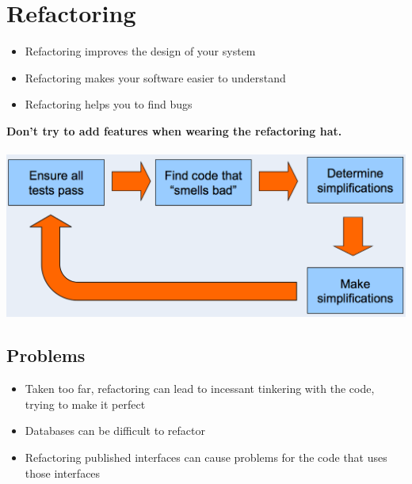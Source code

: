 \documentclass[a4paper,10pt]{article}
\newcommand{\Bold}[1]{\textbf{#1}} %
\begin{document}
\newpage
\section{Refactoring}
\begin{itemize}
	\item Refactoring improves the design of your system
	\item Refactoring makes your software easier to understand
	\item Refactoring helps you to find bugs
\end{itemize}
\Bold {Don't try to add features when wearing the refactoring hat.} \\ \\
\includegraphics[scale=0.4]{refactoring_workflow.png}

\subsection{Problems}
\begin{itemize}
	\item Taken too far, refactoring can lead to incessant tinkering with the code, trying to make it perfect
	\item Databases can be difficult to refactor
	\item Refactoring published interfaces can cause problems for the code that uses those interfaces
\end{itemize}
\end{document}
